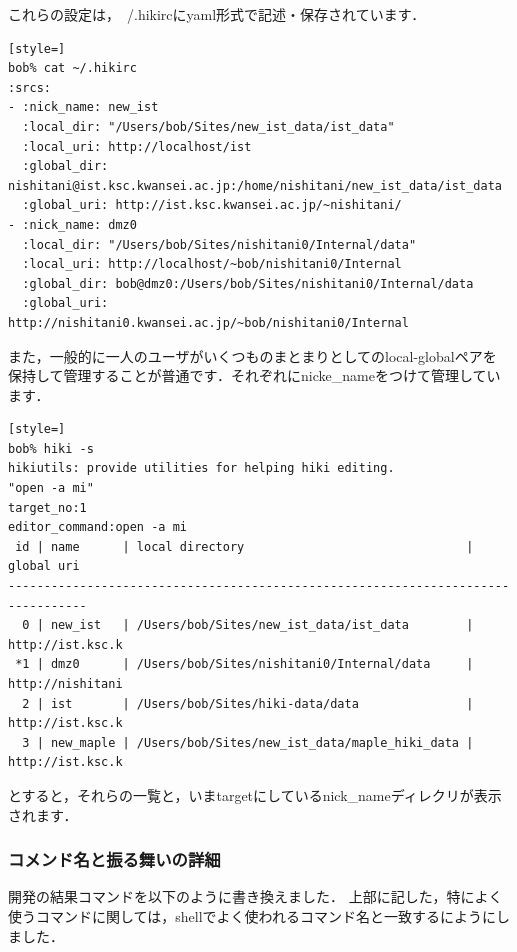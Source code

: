 これらの設定は，~/.hikircにyaml形式で記述・保存されています．
\begin{lstlisting}[style=]
bob% cat ~/.hikirc
:srcs:
- :nick_name: new_ist
  :local_dir: "/Users/bob/Sites/new_ist_data/ist_data"
  :local_uri: http://localhost/ist
  :global_dir: nishitani@ist.ksc.kwansei.ac.jp:/home/nishitani/new_ist_data/ist_data
  :global_uri: http://ist.ksc.kwansei.ac.jp/~nishitani/
- :nick_name: dmz0
  :local_dir: "/Users/bob/Sites/nishitani0/Internal/data"
  :local_uri: http://localhost/~bob/nishitani0/Internal
  :global_dir: bob@dmz0:/Users/bob/Sites/nishitani0/Internal/data
  :global_uri: http://nishitani0.kwansei.ac.jp/~bob/nishitani0/Internal
\end{lstlisting}
また，一般的に一人のユーザがいくつものまとまりとしてのlocal-globalペアを
保持して管理することが普通です．それぞれにnicke\_nameをつけて管理しています．
\begin{lstlisting}[style=]
bob% hiki -s
hikiutils: provide utilities for helping hiki editing.
"open -a mi"
target_no:1
editor_command:open -a mi
 id | name      | local directory                               | global uri     
---------------------------------------------------------------------------------
  0 | new_ist   | /Users/bob/Sites/new_ist_data/ist_data        | http://ist.ksc.k
 *1 | dmz0      | /Users/bob/Sites/nishitani0/Internal/data     | http://nishitani
  2 | ist       | /Users/bob/Sites/hiki-data/data               | http://ist.ksc.k
  3 | new_maple | /Users/bob/Sites/new_ist_data/maple_hiki_data | http://ist.ksc.k
\end{lstlisting}
とすると，それらの一覧と，いまtargetにしているnick\_nameディレクリが表示されます．

\subsubsection{コメンド名と振る舞いの詳細}
開発の結果コマンドを以下のように書き換えました．
上部に記した，特によく使うコマンドに関しては，shellでよく使われるコマンド名と一致するにようにしました．

